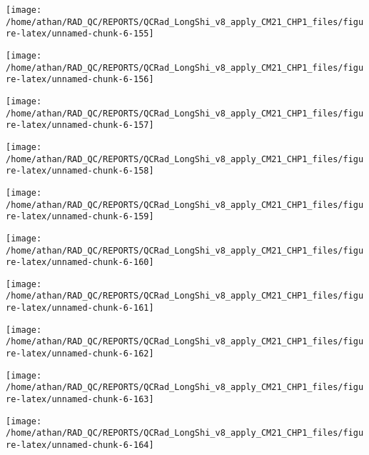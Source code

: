 \documentclass[
  10pt,
  a4paper,oneside]{article}
\begin{document}
\begin{center}\texttt{[image: /home/athan/RAD\_QC/REPORTS/QCRad\_LongShi\_v8\_apply\_CM21\_CHP1\_files/figure-latex/unnamed-chunk-6-155]} \end{center}

\begin{center}\texttt{[image: /home/athan/RAD\_QC/REPORTS/QCRad\_LongShi\_v8\_apply\_CM21\_CHP1\_files/figure-latex/unnamed-chunk-6-156]} \end{center}

\begin{center}\texttt{[image: /home/athan/RAD\_QC/REPORTS/QCRad\_LongShi\_v8\_apply\_CM21\_CHP1\_files/figure-latex/unnamed-chunk-6-157]} \end{center}

\begin{center}\texttt{[image: /home/athan/RAD\_QC/REPORTS/QCRad\_LongShi\_v8\_apply\_CM21\_CHP1\_files/figure-latex/unnamed-chunk-6-158]} \end{center}

\begin{center}\texttt{[image: /home/athan/RAD\_QC/REPORTS/QCRad\_LongShi\_v8\_apply\_CM21\_CHP1\_files/figure-latex/unnamed-chunk-6-159]} \end{center}

\begin{center}\texttt{[image: /home/athan/RAD\_QC/REPORTS/QCRad\_LongShi\_v8\_apply\_CM21\_CHP1\_files/figure-latex/unnamed-chunk-6-160]} \end{center}

\begin{center}\texttt{[image: /home/athan/RAD\_QC/REPORTS/QCRad\_LongShi\_v8\_apply\_CM21\_CHP1\_files/figure-latex/unnamed-chunk-6-161]} \end{center}

\begin{center}\texttt{[image: /home/athan/RAD\_QC/REPORTS/QCRad\_LongShi\_v8\_apply\_CM21\_CHP1\_files/figure-latex/unnamed-chunk-6-162]} \end{center}

\begin{center}\texttt{[image: /home/athan/RAD\_QC/REPORTS/QCRad\_LongShi\_v8\_apply\_CM21\_CHP1\_files/figure-latex/unnamed-chunk-6-163]} \end{center}

\begin{center}\texttt{[image: /home/athan/RAD\_QC/REPORTS/QCRad\_LongShi\_v8\_apply\_CM21\_CHP1\_files/figure-latex/unnamed-chunk-6-164]} \end{center}
\end{document}
